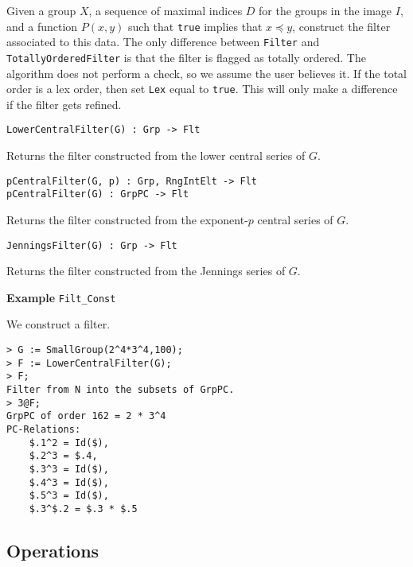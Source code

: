 \documentclass{amsart}
\begin{document}
Given a group $X$, a sequence of maximal indices $D$ for the groups in the image $I$, and a function $P(x,y)$ such that {\tt true} implies that $x\preceq y$, construct the filter associated to this data.
The only difference between {\tt Filter} and {\tt TotallyOrderedFilter} is that the filter is flagged as totally ordered.
The algorithm does not perform a check, so we assume the user believes it.
If the total order is a lex order, then set {\tt Lex} equal to {\tt true}. 
This will only make a difference if the filter gets refined.

\color{blue}
{\small 
\begin{verbatim}
LowerCentralFilter(G) : Grp -> Flt
\end{verbatim} }
\color{black}

Returns the filter constructed from the lower central series of $G$.

\color{blue}
{\small 
\begin{verbatim}
pCentralFilter(G, p) : Grp, RngIntElt -> Flt
pCentralFilter(G) : GrpPC -> Flt
\end{verbatim} }
\color{black}

Returns the filter constructed from the exponent-$p$ central series of $G$.

\color{blue}
{\small 
\begin{verbatim}
JenningsFilter(G) : Grp -> Flt
\end{verbatim} }
\color{black}

Returns the filter constructed from the Jennings series of $G$.

\begin{framed}
{\bf Example} {\tt Filt\_Const}\\
{\small We construct a filter.
\begin{lstlisting}[frame=single,basicstyle=\ttfamily\color{black!30!teal},backgroundcolor=\color{white!70!gray}]
> G := SmallGroup(2^4*3^4,100);
> F := LowerCentralFilter(G); 
> F;
Filter from N into the subsets of GrpPC.
> 3@F;
GrpPC of order 162 = 2 * 3^4
PC-Relations:
    $.1^2 = Id($), 
    $.2^3 = $.4, 
    $.3^3 = Id($), 
    $.4^3 = Id($), 
    $.5^3 = Id($), 
    $.3^$.2 = $.3 * $.5
\end{lstlisting}
}
\end{framed}

\subsection{Operations}
\end{document}
